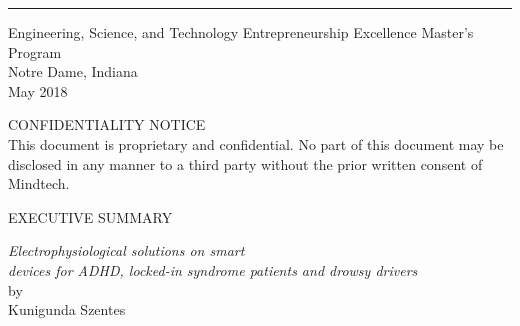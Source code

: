 \documentclass[letterpaper,10pt]{article}
\begin{document}
\begin{flushright}
\hspace{0.3in}\noindent\rule{7cm}{0.4pt}
\end{flushright}
\vspace{4mm}

\vfill
\begin{center}
Engineering, Science, and Technology Entrepreneurship Excellence Master's Program\\
Notre Dame, Indiana\\
May 2018\\
\end{center}
\onehalfspacing
\pagebreak
\pagestyle{plain}

\hspace{0pt}
\vfill
\begin{center}
\uppercase{\Large{Confidentiality notice}} \\
\vspace{10mm}
\normalsize{This document is proprietary and confidential. No part of this document may be disclosed in any manner to a third party without the prior written consent of Mindtech.}
\end{center}
\vfill
\hspace{0pt}
\pagebreak


\vspace{100mm}
\begin{center}
\uppercase{\Large{Executive Summary\\}}
\vspace{5mm}
\Large{\textit{Electrophysiological solutions on smart \\ devices for ADHD, locked-in syndrome patients and drowsy drivers\\}}
\vspace{5mm}
\normalsize{by\\}
\vspace{5mm}
\normalsize{Kunigunda Szentes\\}
\vspace{15mm}
\end{center}
\end{document}
